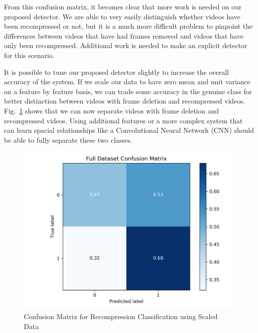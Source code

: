 From this confusion matrix, it becomes clear that more work is needed on our proposed detector. We are able to very easily distinguish whether videos have been recompressed or not, but it is a much more difficult problem to pinpoint the differences between videos that have had frames removed and videos that have only been recompressed. Additional work is needed to make an explicit detector for this scenario.

It is possible to tune our proposed detector slightly to increase the overall accuracy of the system. If we scale our data to have zero mean and unit variance on a feature by feature basis, we can trade some accuracy in the genuine class for better distinction between videos with frame deletion and recompressed videos. Fig.~\ref{scaledcm} shows that we can now separate videos with frame deletion and recompressed videos. Using additional features or a more complex system that can learn spacial relationships like a Convolutional Neural Network (CNN) should be able to fully separate these two classes.
%
\begin{figure}[htbp]
\centerline{\includegraphics[width=0.67\linewidth]{ExperimentalResults/scaled_cm.png}}
\caption{Confusion Matrix for Recompression Classification using Scaled Data}
\label{scaledcm}
\end{figure}
